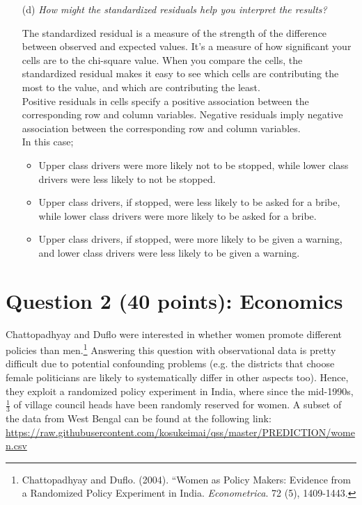 \documentclass[12pt,letterpaper]{article}
\begin{document}
\begin{enumerate}
\begin{table}[h]
\begin{tabular}{l | c c c }
			\end{tabular}
		\end{table}
		
		\vspace{.5cm}
		\item [(d)] \emph{How might the standardized residuals help you interpret the results?  }
		
		\noindent The standardized residual is a measure of the strength of the difference between observed and expected values. It’s a measure of how significant your cells are to the chi-square value. When you compare the cells, the standardized residual makes it easy to see which cells are contributing the most to the value, and which are contributing the least. \\
		
		Positive residuals in cells specify a positive association between the corresponding row and column variables. Negative residuals imply negative association between the corresponding row and column variables. \\
		
		In this case; 
		\begin{itemize}
			\item Upper class drivers were more likely not to be stopped, while lower class drivers were less likely to not be stopped.
			\item Upper class drivers, if stopped, were less likely to be asked for a bribe, while lower class drivers were more likely to be asked for a bribe. 
			\item Upper class drivers, if stopped, were more likely to be given a warning, and lower class drivers were less likely to be given a warning. 
		\end{itemize}
	\end{enumerate}
	\newpage
	
	\section*{Question 2 (40 points): Economics}
	Chattopadhyay and Duflo were interested in whether women promote different policies than men.\footnote{Chattopadhyay and Duflo. (2004). ``Women as Policy Makers: Evidence from a Randomized Policy Experiment in India. \textit{Econometrica}. 72 (5), 1409-1443.} Answering this question with observational data is pretty difficult due to potential confounding problems (e.g. the districts that choose female politicians are likely to systematically differ in other aspects too). Hence, they exploit a randomized policy experiment in India, where since the mid-1990s, $\frac{1}{3}$ of village council heads have been randomly reserved for women. A subset of the data from West Bengal can be found at the following link: \url{https://raw.githubusercontent.com/kosukeimai/qss/master/PREDICTION/women.csv}\\
	
\end{document}

